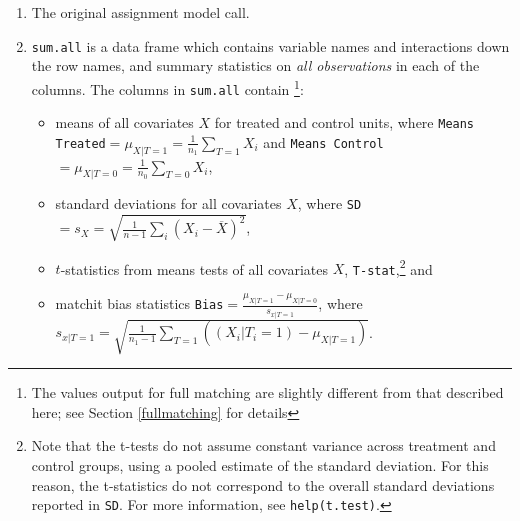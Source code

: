 \documentclass[oneside,letterpaper,titlepage]{article}
\begin{document}
\begin{enumerate}
\item The original assignment model call.
\item \texttt{sum.all} is a data frame which contains variable names
  and interactions down the row names, and summary statistics on
  \emph{all observations} in each of the columns.  The columns in
  \texttt{sum.all} contain \footnote{The values output for full
    matching are slightly different from that described here; see
    Section \ref{fullmatching} for details}:
  \begin{itemize}
  \item means of all covariates $X$ for treated and control units,
    where \texttt{Means Treated}$= \mu_{X|T=1} = \frac{1}{n_1}
    \sum_{T=1} X_i$ and \texttt{Means Control}$= \mu_{X|T=0} =
    \frac{1}{n_0} \sum_{T=0} X_i$,
  \item standard deviations for all covariates $X$, where
    \texttt{SD}$= s_X = \sqrt{\frac{1}{n-1} \sum_{i} (X_i -
      \overline{X})^2}$,
  \item $t$-statistics from means tests of all covariates $X$,
    \texttt{T-stat},\footnote{Note that the t-tests do not assume
      constant variance across treatment and control groups, using a
      pooled estimate of the standard deviation.  For this reason, the
      t-statistics do not correspond to the overall standard
      deviations reported in \texttt{SD}.  For more information, see
      \texttt{help(t.test)}.} and
  \item matchit bias statistics \texttt{Bias}$=\frac{\mu_{X|T=1} -
      \mu_{X|T=0}}{s_{x|T=1}}$, where $s_{x|T=1} =
    \sqrt{\frac{1}{n_1-1} \sum_{T=1} ( (X_i|T_i=1) - \mu_{X|T=1})}$.
  \end{itemize}
  

\end{enumerate}
\end{document}
